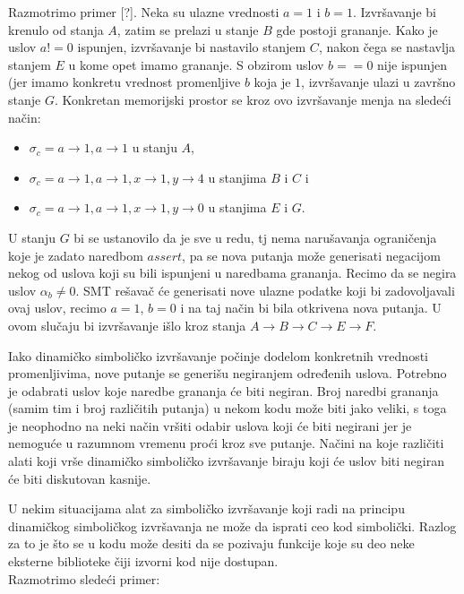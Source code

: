 \documentclass[12pt]{article}
\begin{document}
Razmotrimo primer [?]. Neka su ulazne vrednosti $a = 1$ i $b = 1$. Izvršavanje bi krenulo od stanja $A$, 
zatim se prelazi u stanje $B$ gde postoji grananje.
Kako je uslov $a != 0$ ispunjen, izvršavanje bi nastavilo stanjem $C$, nakon čega se nastavlja stanjem $E$ u kome opet imamo grananje. S obzirom uslov $b == 0$ nije ispunjen (jer imamo konkretu vrednost promenljive $b$ koja je $1$, izvršavanje ulazi u završno stanje $G$. 
Konkretan memorijski prostor se kroz ovo izvršavanje menja na sledeći način:
\begin{itemize}
    \item $\sigma_c = {a \rightarrow 1, a \rightarrow 1}$ u stanju $A$,
    
    \item $\sigma_c = {a \rightarrow 1, a \rightarrow 1, x \rightarrow 1, y \rightarrow 4}$ u stanjima $B$ i $C$ i
    
    \item $\sigma_c = {a \rightarrow 1, a \rightarrow 1, x \rightarrow 1, y \rightarrow 0}$ u stanjima $E$ i $G$.
\end{itemize}
U stanju $G$ bi se ustanovilo da je sve u redu, tj nema narušavanja ograničenja koje je zadato naredbom $assert$, pa se nova putanja može generisati negacijom nekog od uslova koji su bili ispunjeni u naredbama grananja. Recimo da se negira uslov $\alpha_b \neq 0$. SMT rešavač će generisati nove ulazne podatke koji bi zadovoljavali ovaj uslov, recimo $a = 1$, $b = 0$ i na taj način bi bila otkrivena nova putanja. U ovom slučaju bi izvršavanje išlo kroz stanja $A \rightarrow B \rightarrow C \rightarrow E \rightarrow F$.

Iako dinamičko simboličko izvršavanje počinje dodelom konkretnih vrednosti promenljivima, nove putanje se generišu negiranjem određenih uslova. Potrebno je odabrati uslov koje naredbe grananja će biti negiran. Broj naredbi grananja (samim tim i broj različitih putanja) u nekom kodu može biti jako veliki, s toga je neophodno na neki način vršiti odabir uslova koji će biti negirani jer je nemoguće u razumnom vremenu proći kroz sve putanje. Načini na koje različiti alati koji vrše dinamičko simboličko izvršavanje biraju koji će uslov biti negiran će biti diskutovan kasnije. 

U nekim situacijama alat za simboličko izvršavanje koji radi na principu dinamičkog simboličkog izvršavanja ne može da isprati ceo kod simbolički. Razlog za to je što se u kodu može desiti da se pozivaju funkcije koje su deo neke eksterne biblioteke čiji izvorni kod nije dostupan. \\
Razmotrimo sledeći primer:
\end{document}
